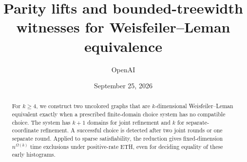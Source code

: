 \documentclass[11pt]{article}
\title{Parity lifts and bounded-treewidth witnesses for Weisfeiler--Leman equivalence}
\author{OpenAI}
\date{September 25, 2026}
\theoremstyle{definition}
\theoremstyle{remark}
\numberwithin{equation}{section}
\begin{document}
\maketitle
\begin{abstract}
For \(k\ge4\), we construct two uncolored graphs that are
\(k\)-dimensional Weisfeiler--Leman equivalent exactly when a prescribed
finite-domain choice system has no compatible choice. The system has
\(k+1\) domains for joint refinement and \(k\) for separate-coordinate
refinement. A successful choice is detected after two joint rounds or
one separate round.
Applied to sparse satisfiability, the reduction gives fixed-dimension
\(n^{\Omega(k)}\) time exclusions under positive-rate ETH, even for
deciding equality of these early histograms.
\end{abstract}









\end{document}
